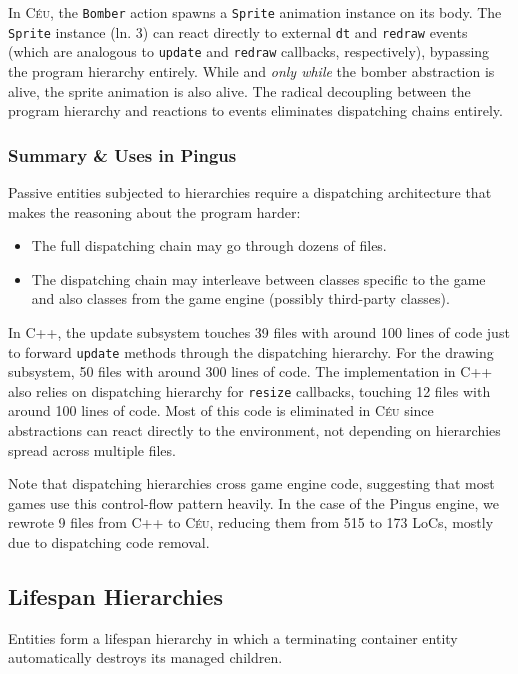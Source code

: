 \documentclass{vgtc}                          %
\newcommand{\CEU}{\textsc{C\'{e}u}\xspace}
\newcommand{\code}[1] {{\small{\texttt{#1}}}}
\begin{document}
In \CEU, the \code{Bomber} action spawns a \code{Sprite} animation instance on
its body.
%
The \code{Sprite} instance (ln. 3) can react directly to external \code{dt} and
\code{redraw} events (which are analogous to \code{update} and \code{redraw}
callbacks, respectively), bypassing the program hierarchy entirely.
While and \emph{only while} the bomber abstraction is alive, the sprite
animation is also alive.
The radical decoupling between the program hierarchy and reactions to events
eliminates dispatching chains entirely.

\subsubsection{Summary \& Uses in Pingus}

Passive entities subjected to hierarchies require a dispatching architecture
that makes the reasoning about the program harder:

\begin{itemize}
\item The full dispatching chain may go through dozens of files.
\item The dispatching chain may interleave between classes specific to the game
      and also classes from the game engine (possibly third-party classes).
\end{itemize}

In C++, the update subsystem touches 39 files with around 100 lines of code
just to forward \code{update} methods through the dispatching hierarchy.
For the drawing subsystem, 50 files with around 300 lines of code.
The implementation in C++ also relies on dispatching hierarchy for
\code{resize} callbacks, touching 12 files with around 100 lines of code.
%
Most of this code is eliminated in \CEU since abstractions can react directly
to the environment, not depending on hierarchies spread across multiple files.

Note that dispatching hierarchies cross game engine code, suggesting that most
games use this control-flow pattern heavily.
In the case of the Pingus engine, we rewrote 9 files from C++ to \CEU, reducing
them from 515 to 173 LoCs, mostly due to dispatching code removal.

\subsection{Lifespan Hierarchies}
\label{sec.pats.lifespan}

    Entities form a lifespan hierarchy in which a terminating container entity
    automatically destroys its managed children.
\end{document}
